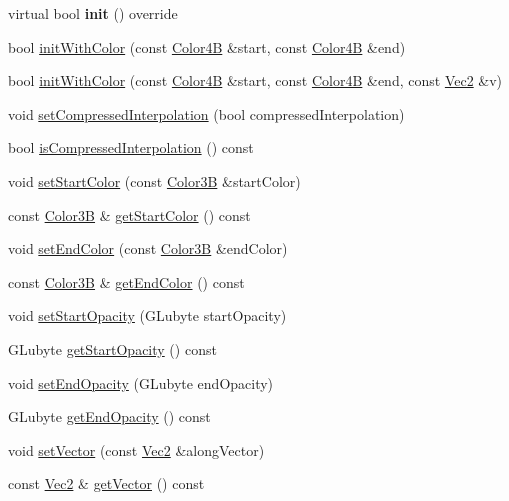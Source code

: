 \begin{DoxyCompactItemize}
virtual bool {\bfseries init} () override
\item 
bool \hyperlink{classLayerGradient_a4525eb8334b09187ffcf99ece5b5b9e8}{init\+With\+Color} (const \hyperlink{structColor4B}{Color4B} \&start, const \hyperlink{structColor4B}{Color4B} \&end)
\item 
bool \hyperlink{classLayerGradient_abd19450a8badd0016dabdb6c3cf96f59}{init\+With\+Color} (const \hyperlink{structColor4B}{Color4B} \&start, const \hyperlink{structColor4B}{Color4B} \&end, const \hyperlink{classVec2}{Vec2} \&v)
\item 
void \hyperlink{classLayerGradient_a2fff019a1124d56ebea72ce4119d5309}{set\+Compressed\+Interpolation} (bool compressed\+Interpolation)
\item 
bool \hyperlink{classLayerGradient_af26407251465e14e789b4d2b5948791a}{is\+Compressed\+Interpolation} () const
\item 
void \hyperlink{classLayerGradient_a80ff3a646b83447f94e617150c560e08}{set\+Start\+Color} (const \hyperlink{structColor3B}{Color3B} \&start\+Color)
\item 
const \hyperlink{structColor3B}{Color3B} \& \hyperlink{classLayerGradient_a0d35d5f39c25afbccf4282c7519052c5}{get\+Start\+Color} () const
\item 
void \hyperlink{classLayerGradient_a77846684f7babd57ee10cd96d3f3dd21}{set\+End\+Color} (const \hyperlink{structColor3B}{Color3B} \&end\+Color)
\item 
const \hyperlink{structColor3B}{Color3B} \& \hyperlink{classLayerGradient_a01bd7bd9de3a530846188d0ec7e73375}{get\+End\+Color} () const
\item 
void \hyperlink{classLayerGradient_a435d90e278ecd977feb7f0057572ed1d}{set\+Start\+Opacity} (G\+Lubyte start\+Opacity)
\item 
G\+Lubyte \hyperlink{classLayerGradient_ab1f50492888f24a3a86c8f43f4da7711}{get\+Start\+Opacity} () const
\item 
void \hyperlink{classLayerGradient_ace5db1ce5036e95b70f3038391f74f83}{set\+End\+Opacity} (G\+Lubyte end\+Opacity)
\item 
G\+Lubyte \hyperlink{classLayerGradient_a2045011cab0c21177dcc93408c1e5c23}{get\+End\+Opacity} () const
\item 
void \hyperlink{classLayerGradient_aefd1b00ca1d723c736bdb7a2ff4a802b}{set\+Vector} (const \hyperlink{classVec2}{Vec2} \&along\+Vector)
\item 
const \hyperlink{classVec2}{Vec2} \& \hyperlink{classLayerGradient_ab49b8e9891ff51fcdc8c11d87f5ba763}{get\+Vector} () const

\end{DoxyCompactItemize}
